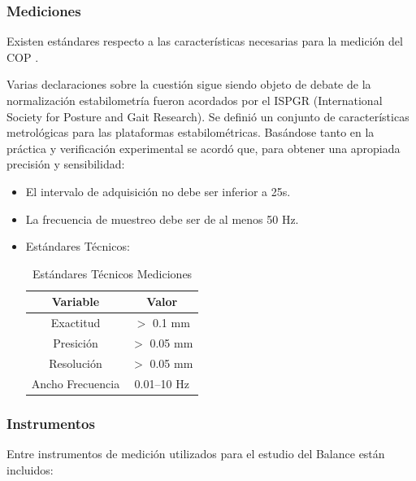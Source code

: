 \documentclass[12pt,a4paper]{article}
\begin{document}
\subsubsection{Mediciones} Existen estándares respecto a las características necesarias para la medición del COP \cite{scoppa_clinical_2013}.

Varias declaraciones sobre la cuestión sigue siendo objeto de debate de la normalización estabilometría fueron acordados por el ISPGR (International Society for Posture and Gait Research).
Se definió un conjunto de características metrológicas para las plataformas estabilométricas.
Basándose tanto en la práctica y verificación experimental se acordó que, para obtener una apropiada precisión y sensibilidad:
\begin{itemize}
	\item El intervalo de adquisición no debe ser inferior a 25s.
	\item La frecuencia de muestreo debe ser de al menos 50 Hz.
	\item Estándares Técnicos:
	\begin{table}[H]
		\centering
		\label{table:mediciones}
		\begin{tabular}{|c|c|}			
			\hline \textbf{Variable} & \textbf{Valor} 	\\ 
			\hline Exactitud 	& $>$ 0.1 mm 		\\ 
			\hline Presición 	& $>$ 0.05 mm 		\\ 
			\hline Resolución 	& $>$ 0.05 mm 		\\ 
			\hline Ancho Frecuencia & 0.01–10 Hz	\\ 
			\hline 			
		\end{tabular}
		\caption{Estándares Técnicos Mediciones}
	\end{table}	  
\end{itemize}

\subsubsection{Instrumentos} Entre instrumentos de medición utilizados para el estudio del Balance están incluidos:
\end{document}
